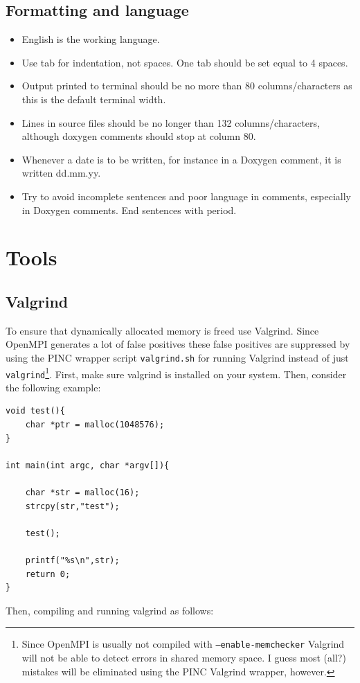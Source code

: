 \documentclass[10pt,a4paper]{article}
\begin{document}
\subsection{Formatting and language}

\begin{itemize}
	\item English is the working language.
	\item Use tab for indentation, not spaces. One tab should be set equal to 4 spaces.
	\item Output printed to terminal should be no more than 80 columns/characters as this is the default terminal width.
	\item Lines in source files should be no longer than 132 columns/characters, although doxygen comments should stop at column 80.
	\item Whenever a date is to be written, for instance in a Doxygen comment, it is written dd.mm.yy.
	\item Try to avoid incomplete sentences and poor language in comments, especially in Doxygen comments. End sentences with period.
\end{itemize}

\section{Tools}
\subsection{Valgrind}
To ensure that dynamically allocated memory is freed use Valgrind. Since OpenMPI generates a lot of false positives these false positives are suppressed by using the PINC wrapper script \verb$valgrind.sh$ for running Valgrind instead of just \verb$valgrind$\footnote{Since OpenMPI is usually not compiled with \texttt{--enable-memchecker} Valgrind will not be able to detect errors in shared memory space. I guess most (all?) mistakes will be eliminated using the PINC Valgrind wrapper, however.}. First, make sure valgrind is installed on your system. Then, consider the following example:

\begin{lstlisting}
void test(){
	char *ptr = malloc(1048576);
}

int main(int argc, char *argv[]){

	char *str = malloc(16);
	strcpy(str,"test");
	
	test();

	printf("%s\n",str);
	return 0;
}
\end{lstlisting}
Then, compiling and running valgrind as follows:
\end{document}
